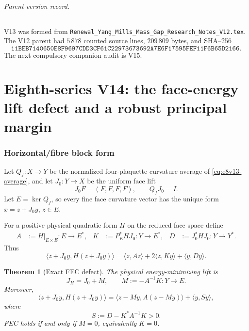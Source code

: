 \documentclass[11pt,oneside]{book}
\newtheorem{theorem}{Theorem}[chapter]
\theoremstyle{definition}
\theoremstyle{remark}
\begin{document}
\paragraph{Parent-version record.}
V13 was formed from
\texttt{Renewal\_Yang\_Mills\_Mass\_Gap\_Research\_Notes\_V12.tex}.
The V12 parent had \(5\,878\) counted source lines,
\(209\,809\) bytes, and SHA--256
\[
\texttt{11BEB7140650E8F9697CDD3CF61C22973673692A7E6F17595FEF11F6B65D2166}.
\]
The next compulsory companion audit is V15.



\part{Eighth-series V14: the face-energy lift defect and a robust
principal margin}
\label{part:e8v14}

\section{Horizontal/fibre block form}
\label{sec:e8v14-block}

Let \(Q_f:X\to Y\) be the normalized four-plaquette curvature average
of \eqref{eq:e8v13-average}, and let \(J_0:Y\to X\) be the uniform
face lift
\[
 J_0F=(F,F,F,F),\qquad Q_fJ_0=I.                   \label{eq:e8v14-J0}
\]
Let \(E=\ker Q_f\), so every fine face curvature vector has the unique
form \(x=z+J_0y\), \(z\in E\).

For a positive physical quadratic form \(H\) on the reduced face
space define
\begin{align}
 A&:=H|_{E\times E}:E\to E^*,&
 K&:=P_E^*HJ_0:Y\to E^*,&
 D&:=J_0^*HJ_0:Y\to Y^*.                            \label{eq:e8v14-AKD}
\end{align}
Thus
\[
 \langle z+J_0y,H(z+J_0y)\rangle
 =
 \langle z,Az\rangle+2\langle z,Ky\rangle
 +\langle y,Dy\rangle.                              \label{eq:e8v14-block-form}
\]

\begin{theorem}[Exact FEC defect]
\label{thm:e8v14-defect}
The physical energy-minimizing lift is
\[
 J_H=J_0+M,\qquad M:=-A^{-1}K:Y\to E.               \label{eq:e8v14-M}
\]
Moreover,
\[
 \langle z+J_0y,H(z+J_0y)\rangle
 =
 \langle z-M y,A(z-M y)\rangle
 +\langle y,Sy\rangle,                              \label{eq:e8v14-square}
\]
where
\[
 S:=D-K^*A^{-1}K>0.                                \label{eq:e8v14-S}
\]
FEC holds if and only if \(M=0\), equivalently \(K=0\).
\end{theorem}
\end{document}

